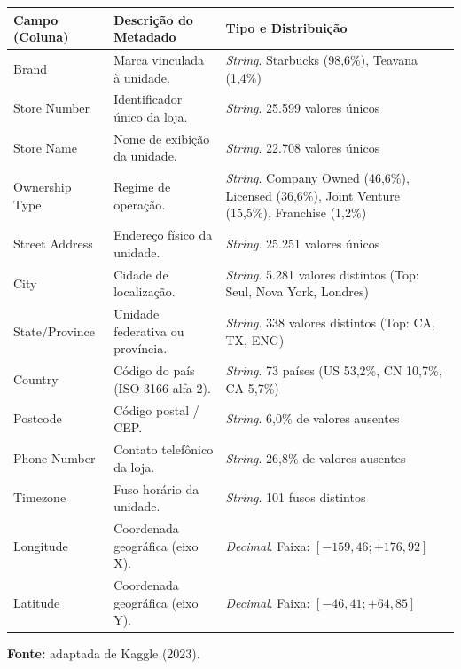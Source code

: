 \begin{quadro}[H]
    \captionsetup{justification=raggedright, singlelinecheck=false}
    \caption{Estrutura e metadados do arquivo .csv (Starbucks 2023)}
    \label{qua:estrutura_csv}
   \centering
\begin{tabular}{|l|p{}|p{}|}
\hline
\textbf{Campo (Coluna)} & \textbf{Descrição do Metadado} & \textbf{Tipo e Distribuição} \\ \hline
Brand & Marca vinculada à unidade. & \textit{String}. Starbucks (98,6\%), Teavana (1,4\%) \\ \hline
Store Number & Identificador único da loja. & \textit{String}. 25.599 valores únicos \\ \hline
Store Name & Nome de exibição da unidade. & \textit{String}. 22.708 valores únicos \\ \hline
Ownership Type & Regime de operação. & \textit{String}. Company Owned (46,6\%), Licensed (36,6\%), Joint Venture (15,5\%), Franchise (1,2\%) \\ \hline
Street Address & Endereço físico da unidade. & \textit{String}. 25.251 valores únicos \\ \hline
City & Cidade de localização. & \textit{String}. 5.281 valores distintos (Top: Seul, Nova York, Londres) \\ \hline
State/Province & Unidade federativa ou província. & \textit{String}. 338 valores distintos (Top: CA, TX, ENG) \\ \hline
Country & Código do país (ISO-3166 alfa-2). & \textit{String}. 73 países (US 53,2\%, CN 10,7\%, CA 5,7\%) \\ \hline
Postcode & Código postal / CEP. & \textit{String}. 6,0\% de valores ausentes \\ \hline
Phone Number & Contato telefônico da loja. & \textit{String}. 26,8\% de valores ausentes \\ \hline
Timezone & Fuso horário da unidade. & \textit{String}. 101 fusos distintos \\ \hline
Longitude & Coordenada geográfica (eixo X). & \textit{Decimal}. Faixa: $[-159,46; +176,92]$ \\ \hline
Latitude & Coordenada geográfica (eixo Y). & \textit{Decimal}. Faixa: $[-46,41; +64,85]$ \\ \hline
\end{tabular}

\vspace{0.1cm}
\centering
    {\footnotesize \textbf{Fonte:} adaptada de Kaggle (2023).}

\end{quadro}

